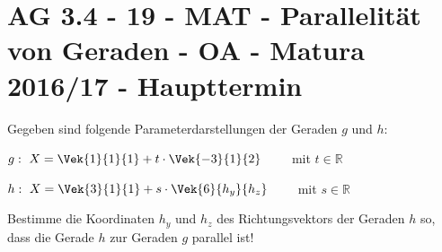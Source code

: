 \section{AG 3.4 - 19 - MAT - Parallelität von Geraden - OA - Matura 2016/17 - Haupttermin}

\begin{beispiel}[AG 3.4]{1} %
Gegeben sind folgende Parameterdarstellungen der Geraden $g$ und $h$:\leer

$g:~ X=\Vek{1}{1}{1}+t\cdot \Vek{-3}{1}{2} \qquad$ mit $t\in \mathbb{R}$

$h:~ X=\Vek{3}{1}{1}+s\cdot \Vek{6}{h_y}{h_z} \qquad$ mit $s\in \mathbb{R}$ \leer

Bestimme die Koordinaten $h_y$ und $h_z$ des Richtungsvektors der Geraden $h$ so, dass die
Gerade $h$ zur Geraden $g$ parallel ist!


\end{beispiel}